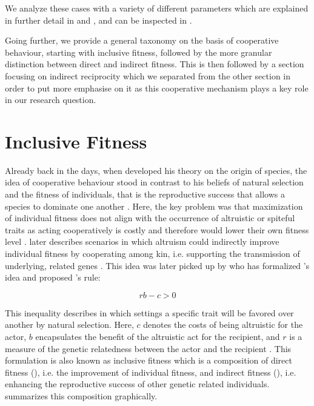 \documentclass[sigconf]{acmart}
\newcommand{\todo}[1]{{\color{red}{#1}}}
\begin{document}
    We analyze these cases with a variety of different parameters which are explained in further detail in  and , and can be inspected in .

    \todo{Mention central results and key insight briefly.}

    Going further, we provide a general taxonomy on the basis of cooperative behaviour, starting with inclusive fitness, followed by the more granular distinction between direct and indirect fitness.
    This is then followed by a section focusing on indirect reciprocity which we separated from the other section in order to put more emphasise on it as this cooperative mechanism plays a key role in our research question.


    \section{Inclusive Fitness}\label{sec:inclusive-fitness}

    Already back in the days, when \citeauthor{darwin_origin_1859} \cite{darwin_origin_1859} developed his theory on the origin of species, the idea of cooperative behaviour stood in contrast to his beliefs of natural selection and the fitness of individuals, that is the reproductive success that allows a species to dominate one another \cite{pennisi_how_2005}.
    Here, the key problem was that maximization of individual fitness does not align with the occurrence of altruistic or spiteful traits as acting cooperatively is costly and therefore would lower their own fitness level \cite{west_altruism_2010}.
    \citeauthor{darwin_origin_1859} later describes scenarios in which altruism could indirectly improve individual fitness by cooperating among kin, i.e. supporting the transmission of underlying, related genes \cite{pennisi_how_2005,gardner_theory_2009}.
    This idea was later picked up by \citeauthor{hamilton_kin_1964} \cite{hamilton_kin_1964} who has formalized \citeauthor{darwin_origin_1859}'s idea and proposed \citeauthor{hamilton_kin_1964}'s rule:

    \begin{equation}
        rb-c>0\label{eq:rb-c}
    \end{equation}


    This inequality describes in which settings a specific trait will be favored over another by natural selection.
    Here, $c$ denotes the costs of being altruistic for the actor, $b$ encapsulates the benefit of the altruistic act for the recipient, and $r$ is a measure of the genetic relatedness between the actor and the recipient \cite{west_altruism_2010}.
    This formulation is also known as inclusive fitness which is a composition of direct fitness (), i.e. the improvement of individual fitness, and indirect fitness (), i.e. enhancing the reproductive success of other genetic related individuals.
     summarizes this composition graphically.
\end{document}
